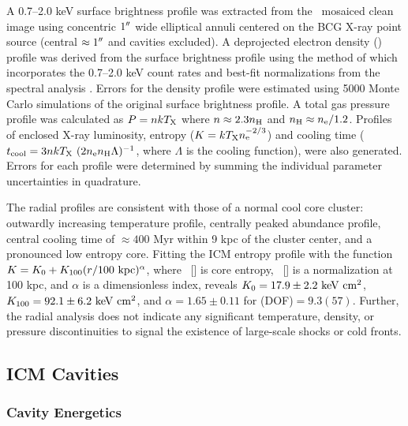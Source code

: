 \documentclass[apjpt4]{aastex}
\begin{document}
A 0.7--2.0 keV surface brightness profile was extracted from the
\cxo\ mosaiced clean image using concentric $1\rm{^\prime}\hskip -0.1em\rm{^\prime}$ wide elliptical
annuli centered on the BCG X-ray point source (central $\approx
1\rm{^\prime}\hskip -0.1em\rm{^\prime}$ and cavities excluded). A deprojected electron density
(\nelec) profile was derived from the surface brightness profile using
the method of \citet{kriss83} which incorporates the 0.7--2.0 keV
count rates and best-fit normalizations from the spectral analysis
\citep[see][for details]{accept}. Errors for the density profile were
estimated using 5000 Monte Carlo simulations of the original surface
brightness profile. A total gas pressure profile was calculated as $P
= n kT_{\rm{X}}$ where $n \approx 2.3 n_{\rm{H}}$ and $n_{\rm{H}} \approx
n_{\rm{e}}/1.2$. Profiles of enclosed X-ray luminosity, entropy ($K = kT_{\rm{X}}
n_{\rm{e}}^{-2/3}$) and cooling time ($t_{\rm{cool}} = 3 n kT_{\rm{X}}~(2 n_{\rm{e}} n_{\rm{H}}
\Lambda)^{-1}$, where $\Lambda$ is the cooling function), were also
generated. Errors for each profile were determined by summing the
individual parameter uncertainties in quadrature.

The radial profiles are consistent with those of a normal cool core
cluster: outwardly increasing temperature profile, centrally peaked
abundance profile, central cooling time of $\approx 400$ Myr within 9
kpc of the cluster center, and a pronounced low entropy core. Fitting
the ICM entropy profile with the function $K = K_0 +K_{100} (r/100
~\mbox{\ensuremath{\rm{kpc}}})^{\alpha}$, where \kna\ [\ent] is core entropy, \khun\ [\ent] is
a normalization at 100 kpc, and $\alpha$ is a dimensionless index,
reveals $K_0 = 17.9 \pm 2.2 ~\rm{\mbox{\ensuremath{\rm{keV}}}~\ensuremath{\rm{\mbox{\ensuremath{\rm{cm}}}^2}}}$, $K_{100} = 92.1 \pm 6.2 ~\rm{\mbox{\ensuremath{\rm{keV}}}~\ensuremath{\rm{\mbox{\ensuremath{\rm{cm}}}^2}}}$, and
$\alpha = 1.65 \pm 0.11$ for \chisq(DOF)$ = 9.3(57)$. Further, the
radial analysis does not indicate any significant temperature,
density, or pressure discontinuities to signal the existence of
large-scale shocks or cold fronts.

\subsection{ICM Cavities}
\label{sec:cavities}

\subsubsection{Cavity Energetics}
\label{sec:ecav}
\end{document}
